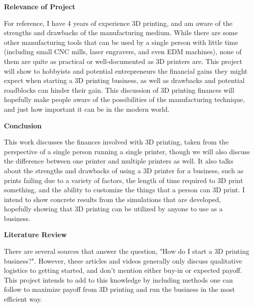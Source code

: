 \documentclass[11pt]{article}
\begin{document}
\bigbreak

\textbf{Relevance of Project}

For reference, I have 4 years of experience 3D printing, and am aware of the strengths and drawbacks of the manufacturing medium. While there are some other manufacturing tools that can be used
by a single person with little time (including small CNC mills, laser engravers, and even EDM machines), none of them are quite as practical or well-documented as 3D printers are. This project will
show to hobbyists and potential entrepreneurs the financial gains they might expect when starting a 3D printing business, as well as drawbacks and potential roadblocks can hinder their gain. This discussion
of 3D printing finances will hopefully make people aware of the possibilities of the manufacturing technique, and just how important it can be in the modern world.

\bigbreak

\textbf{Conclusion}

This work discusses the finances involved with 3D printing, taken from the perspective of a single person running a single printer, though we will also discuss the difference between one printer
and multiple printers as well. It also talks about the strengths and drawbacks of using a 3D printer for a business, such as prints failing due to a variety of factors, the length of time required
to 3D print something, and the ability to customize the things that a person can 3D print. I intend to show concrete results from the simulations that are developed, hopefully showing that 3D printing
can be utilized by anyone to use as a business.

\bigbreak


\begin{center}
    \LARGE
    \textbf{Literature Review}
\end{center}


There are several sources that answer the question, "How do I start a 3D printing business?". However, these articles and videos generally only discuss qualitative
logistics to getting started, and don't mention either buy-in or expected payoff. This project intends to add to this knowledge by including methods one can follow
to maximize payoff from 3D printing and run the business in the most efficient way.
\end{document}
